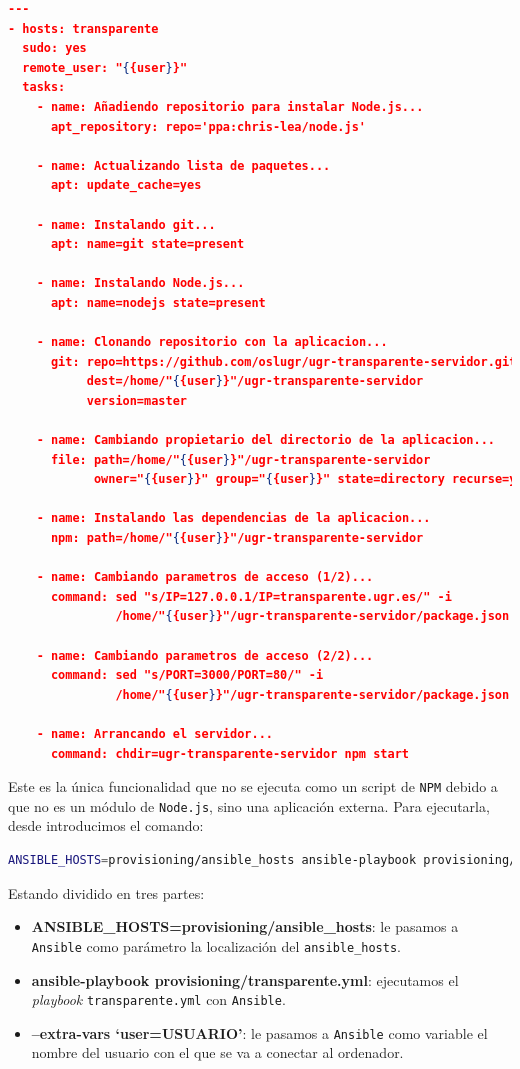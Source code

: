 \begin{lstlisting}[language=json,caption={Playbook de Ansible},label={lst:ansible}]
---
- hosts: transparente
  sudo: yes
  remote_user: "{{user}}"
  tasks:
    - name: Añadiendo repositorio para instalar Node.js...
      apt_repository: repo='ppa:chris-lea/node.js'

    - name: Actualizando lista de paquetes...
      apt: update_cache=yes

    - name: Instalando git...
      apt: name=git state=present

    - name: Instalando Node.js...
      apt: name=nodejs state=present

    - name: Clonando repositorio con la aplicacion...
      git: repo=https://github.com/oslugr/ugr-transparente-servidor.git
           dest=/home/"{{user}}"/ugr-transparente-servidor
           version=master

    - name: Cambiando propietario del directorio de la aplicacion...
      file: path=/home/"{{user}}"/ugr-transparente-servidor
            owner="{{user}}" group="{{user}}" state=directory recurse=yes

    - name: Instalando las dependencias de la aplicacion...
      npm: path=/home/"{{user}}"/ugr-transparente-servidor

    - name: Cambiando parametros de acceso (1/2)...
      command: sed "s/IP=127.0.0.1/IP=transparente.ugr.es/" -i
               /home/"{{user}}"/ugr-transparente-servidor/package.json

    - name: Cambiando parametros de acceso (2/2)...
      command: sed "s/PORT=3000/PORT=80/" -i
               /home/"{{user}}"/ugr-transparente-servidor/package.json

    - name: Arrancando el servidor...
      command: chdir=ugr-transparente-servidor npm start
\end{lstlisting}

Este es la única funcionalidad que no se ejecuta como un script de {\tt NPM} debido a que no es un módulo de {\tt Node.js}, sino una aplicación externa. Para ejecutarla, desde introducimos el comando:

\begin{lstlisting}[language=bash,captionpos=b,caption={Línea de comando de Ansible},label={lst:ejec_ansible}]
ANSIBLE_HOSTS=provisioning/ansible_hosts ansible-playbook provisioning/transparente.yml --extra-vars ``user=USUARIO''
\end{lstlisting}

\bigskip
Estando dividido en tres partes:

\begin{itemize}
	\item \textbf{ANSIBLE\_HOSTS=provisioning/ansible\_hosts}: le pasamos a {\tt Ansible} como parámetro la localización del {\tt ansible\_hosts}.
	\item \textbf{ansible-playbook provisioning/transparente.yml}: ejecutamos el \textit{playbook} {\tt transparente.yml} con {\tt Ansible}.
	\item \textbf{--extra-vars `user=USUARIO'}: le pasamos a {\tt Ansible} como variable el nombre del usuario con el que se va a conectar al ordenador.
\end{itemize}